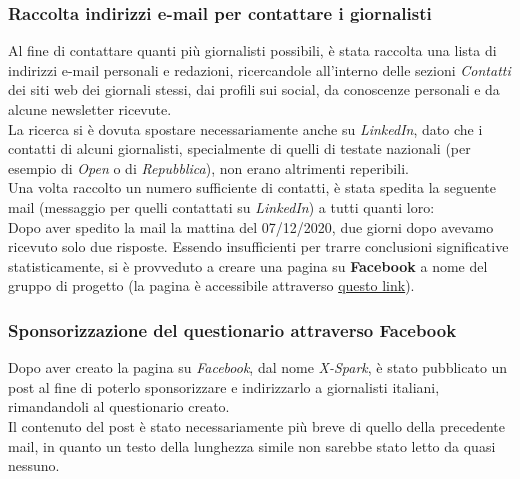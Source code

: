\subsubsection{Raccolta indirizzi e-mail per contattare i giornalisti}
\label{sss:raccolta-indirizzi-mail}
Al fine di contattare quanti più giornalisti possibili, è stata raccolta una lista di indirizzi e-mail personali e redazioni, ricercandole all'interno delle sezioni \textit{Contatti} dei siti web dei giornali stessi, dai profili sui social, da conoscenze personali e da alcune newsletter ricevute.\\
La ricerca si è dovuta spostare necessariamente anche su \textit{LinkedIn}, dato che i contatti di alcuni giornalisti, specialmente di quelli di testate nazionali (per esempio di \textit{Open} o di \textit{Repubblica}), non erano altrimenti reperibili.\\
Una volta raccolto un numero sufficiente di contatti, è stata spedita la seguente mail (messaggio per quelli contattati su \textit{LinkedIn}) a tutti quanti loro:\\

Dopo aver spedito la mail la mattina del 07/12/2020, due giorni dopo avevamo ricevuto solo due risposte.
Essendo insufficienti per trarre conclusioni significative statisticamente, si è provveduto a creare una pagina su \textbf{Facebook} a nome del gruppo di progetto (la pagina è accessibile attraverso \href{https://www.facebook.com/XSparkUnibo}{questo link}).

\subsubsection{Sponsorizzazione del questionario attraverso Facebook}
\label{sss:sponsorizzazione-questionario-facebook}
Dopo aver creato la pagina su \textit{Facebook}, dal nome \textit{X-Spark}, è stato pubblicato un post al fine di poterlo sponsorizzare e indirizzarlo a giornalisti italiani, rimandandoli al questionario creato.\\
Il contenuto del post è stato necessariamente più breve di quello della precedente mail, in quanto un testo della lunghezza simile non sarebbe stato letto da quasi nessuno.

